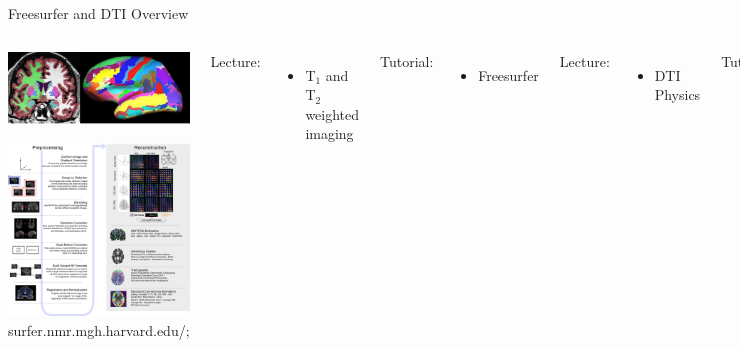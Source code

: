 \documentclass[aspectratio=169,xcolor=dvipsnames]{beamer}
\begin{document}
\begin{frame}{Freesurfer and DTI Overview}
\begin{columns}[c]
\vspace{-.4cm}

\begin{center}
\includegraphics[width=.5\textwidth]{imgs/FSanalysisPipelineFig4}

\includegraphics[width=1\textwidth]{imgs/qsiprep_workflow_full}
\tiny{surfer.nmr.mgh.harvard.edu/; }
\end{center}

Lecture:
\begin{itemize}
\item T$_{1}$ and T$_{2}$ weighted imaging
\end{itemize}

Tutorial:
\begin{itemize}
\item Freesurfer
\end{itemize}

Lecture:
\begin{itemize}
\item DTI Physics
\end{itemize}

Tutorial:
\begin{itemize}
\item DTI preprocessing using \texttt{qsiprep}
\end{itemize}
\end{columns}

\end{frame}
\end{document}
